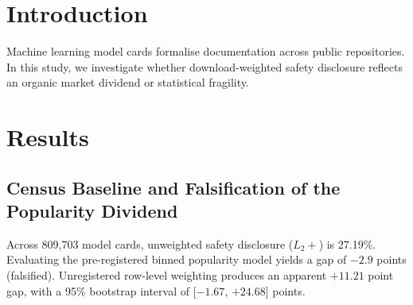 \documentclass[11pt,letterpaper]{article}
\begin{document}
\begin{abstract}
Public model repositories constitute critical digital infrastructure for distributing open-weight artificial intelligence models. While model cards serve as primary instruments for algorithmic transparency, whether documentation practices scale with model usage remains an open empirical question. Here, we present a comprehensive census of safety documentation across 809,703 model cards and 48,247 supply-chain lineage edges on the Hugging Face Hub, encompassing 2.47 billion downloads. Evaluating a pre-registered popularity hypothesis, we find the popularity gap is falsified on the registered binned estimator ($-2.9$ percentage points). On the unregistered row-level vector, the download-weighted safety rate (38.40\%) exceeds unweighted rates (27.19\%) by 11.21 points, but the 95\% bootstrap interval ([$ -1.67$, $+24.68$] points) spans both boundaries and is indeterminate. Extreme Value Theory indicates repository downloads follow an infinite-variance Pareto distribution (Hill tail index $\alpha = 0.98 \le 2$), causing weighted metrics to be hypersensitive to individual corporate releases: omitting the top model alone swings the weighted safety rate by 7.20 percentage points. Furthermore, derivative lineages exhibit severe documentation decay, with an 83.46\% license omission rate on merges. These findings reveal structural vulnerabilities in naive repository metrics, establishing the necessity of tail-trimmed estimators and provenance tracking for data stewardship in open AI ecosystems.
\end{abstract}

\section*{Introduction}
Machine learning model cards formalise documentation across public repositories. In this study, we investigate whether download-weighted safety disclosure reflects an organic market dividend or statistical fragility.

\section*{Results}
\subsection*{Census Baseline and Falsification of the Popularity Dividend}
Across 809,703 model cards, unweighted safety disclosure ($L_2+$) is 27.19\%. Evaluating the pre-registered binned popularity model yields a gap of $-2.9$ points (falsified). Unregistered row-level weighting produces an apparent $+11.21$ point gap, with a 95\% bootstrap interval of [$-1.67$, $+24.68$] points.
\end{document}
